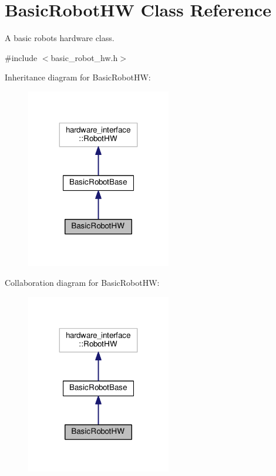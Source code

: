 \hypertarget{classBasicRobotHW}{}\section{Basic\+Robot\+HW Class Reference}
\label{classBasicRobotHW}


A basic robot\textquotesingle{}s hardware class.  




{\ttfamily \#include $<$basic\+\_\+robot\+\_\+hw.\+h$>$}



Inheritance diagram for Basic\+Robot\+HW\+:\nopagebreak
\begin{figure}[H]
\begin{center}
\leavevmode
\includegraphics[width=179pt]{classBasicRobotHW__inherit__graph}
\end{center}
\end{figure}


Collaboration diagram for Basic\+Robot\+HW\+:\nopagebreak
\begin{figure}[H]
\begin{center}
\leavevmode
\includegraphics[width=179pt]{classBasicRobotHW__coll__graph}
\end{center}
\end{figure}
